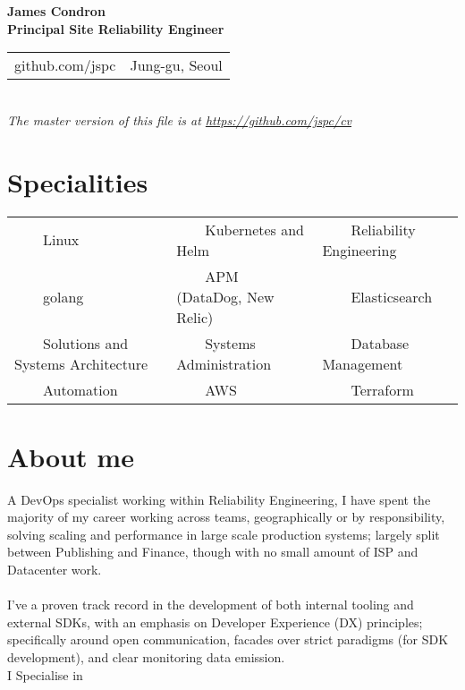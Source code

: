 \documentclass[11pt,a4paper,sans]{article}
\newcommand{\tabitem}{~~\llap{\textbullet}~~}
\begin{document}
\begin{center}
  {\huge\textbf{James Condron}}\\
  \textbf{Principal Site Reliability Engineer} \\

  \begin{tabular}{rl}
    github.com/jspc &  Jung-gu, Seoul
  \end{tabular} \\

  {\footnotesize\textit{The master version of this file is at \url{https://github.com/jspc/cv}}}
\end{center}

\section{Specialities}
\begin{tabular}{lll}
  \tabitem Linux & \tabitem Kubernetes and Helm & \tabitem Reliability Engineering \\
  \tabitem golang & \tabitem APM (DataDog, New Relic) & \tabitem Elasticsearch \\
  \tabitem Solutions and Systems Architecture & \tabitem Systems Administration & \tabitem Database Management \\
  \tabitem Automation & \tabitem AWS & \tabitem Terraform  \\
\end{tabular}

\section{About me}
A DevOps specialist working within Reliability Engineering, I have spent the majority of my career working across teams, geographically or by responsibility, solving scaling and performance in large scale production systems; largely split between Publishing and Finance, though with no small amount of ISP and Datacenter work. \\
\\
I've a proven track record in the development of both internal tooling and external SDKs, with an emphasis on Developer Experience (DX) principles; specifically around open communication, facades over strict paradigms (for SDK development), and clear monitoring data emission.
\\
I Specialise in
\end{document}
